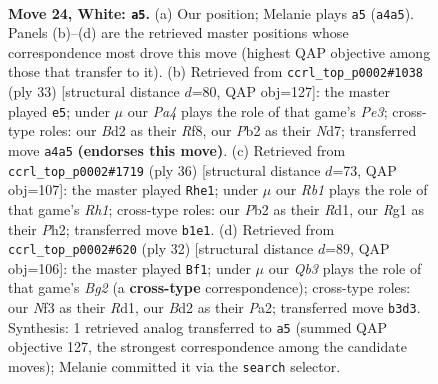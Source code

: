 \documentclass[11pt]{article}
\begin{document}
\clearpage

\begin{figure}[p]\centering
\begin{subfigure}{0.46\textwidth}\centering
\resizebox{\linewidth}{!}{%
\newchessgame
\chessboard[
  setfen={rk3b1r/pp4p1/q1p1b2p/3p1p2/P2P3P/1Q2PN2/1PKB1PP1/1R4R1 w - - 0 24},
  showmover=false,
  pgfstyle=straightmove, color=movearrow, markmove={a4-a5}
]}
\caption{}
\end{subfigure}\hfill
\begin{subfigure}{0.46\textwidth}\centering
\resizebox{\linewidth}{!}{%
\newchessgame
\chessboard[
  setfen={2r2rk1/p2n1pbp/1pp1pqp1/8/2PPQ3/1B2B2P/P1P2PP1/R2R2K1 b - - 0 17},
  showmover=false,
  pgfstyle=straightmove, color=movearrow, markmove={e6-e5}
]}
\caption{}
\end{subfigure}
\\[4pt]
\begin{subfigure}{0.46\textwidth}\centering
\resizebox{\linewidth}{!}{%
\newchessgame
\chessboard[
  setfen={r3k2r/3bbp2/3p1p1p/p1q1pP2/1p2P3/5BN1/PPPQ2PP/1K1R3R w kq - 0 19},
  showmover=false,
  pgfstyle=straightmove, color=movearrow, markmove={h1-e1}
]}
\caption{}
\end{subfigure}\hfill
\begin{subfigure}{0.46\textwidth}\centering
\resizebox{\linewidth}{!}{%
\newchessgame
\chessboard[
  setfen={r4rk1/pb3pp1/1p1qpb1p/3p4/Q2P4/2N1P1P1/PP3PBP/R2R2K1 w - - 1 17},
  showmover=false,
  pgfstyle=straightmove, color=movearrow, markmove={g2-f1}
]}
\caption{}
\end{subfigure}
\caption{\textbf{Move 24, White: \texttt{a5}.} (a) Our position; Melanie plays \texttt{a5} (\texttt{a4a5}). Panels (b)--(d) are the retrieved master positions whose correspondence most drove this move (highest QAP objective among those that transfer to it). (b) Retrieved from \texttt{ccrl\_top\_p0002\#1038} (ply 33) [structural distance $d$=80, QAP obj=127]: the master played \texttt{e5}; under $\mu$ our \emph{Pa4} plays the role of that game's \emph{Pe3}; cross-type roles: our \emph{B}d2 as their \emph{R}f8, our \emph{P}b2 as their \emph{N}d7; transferred move \texttt{a4a5} \textbf{(endorses this move)}. (c) Retrieved from \texttt{ccrl\_top\_p0002\#1719} (ply 36) [structural distance $d$=73, QAP obj=107]: the master played \texttt{Rhe1}; under $\mu$ our \emph{Rb1} plays the role of that game's \emph{Rh1}; cross-type roles: our \emph{P}b2 as their \emph{R}d1, our \emph{R}g1 as their \emph{P}h2; transferred move \texttt{b1e1}. (d) Retrieved from \texttt{ccrl\_top\_p0002\#620} (ply 32) [structural distance $d$=89, QAP obj=106]: the master played \texttt{Bf1}; under $\mu$ our \emph{Qb3} plays the role of that game's \emph{Bg2} (a \textbf{cross-type} correspondence); cross-type roles: our \emph{N}f3 as their \emph{R}d1, our \emph{B}d2 as their \emph{P}a2; transferred move \texttt{b3d3}. Synthesis: 1 retrieved analog transferred to \texttt{a5} (summed QAP objective 127, the strongest correspondence among the candidate moves); Melanie committed it via the \texttt{search} selector.}
\label{fig:thought-m46}
\end{figure}
\end{document}
